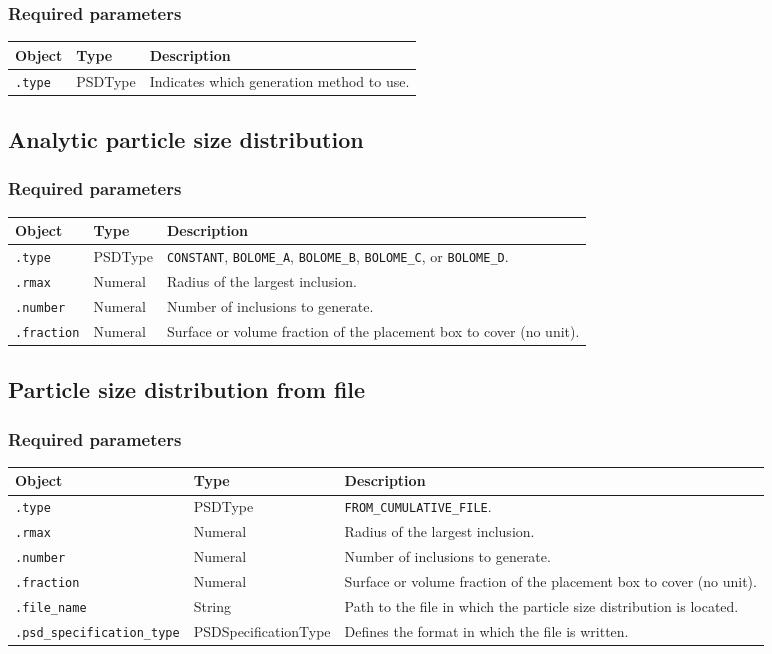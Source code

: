 \documentclass[10pt]{article}
\begin{document}
\subsubsection*{Required parameters}

\begin{tabularx}{\textwidth}{llX}
\hline 
Object & Type & Description \\ 
\hline 
\verb+.type+ & PSDType & Indicates which generation method to use. \\ 
\hline 
\end{tabularx}

\subsection{Analytic particle size distribution}

\subsubsection*{Required parameters}

\begin{tabularx}{\textwidth}{llX}
\hline 
Object & Type & Description \\ 
\hline 
\verb+.type+ & PSDType & \verb+CONSTANT+, \verb+BOLOME_A+, \verb+BOLOME_B+, \verb+BOLOME_C+, or \verb+BOLOME_D+. \\ 
\verb+.rmax+ & Numeral & Radius of the largest inclusion. \\ 
\verb+.number+ & Numeral & Number of inclusions to generate. \\ 
\verb+.fraction+ & Numeral & Surface or volume fraction of the placement box to cover (no unit). \\ 
\hline 
\end{tabularx}

\subsection{Particle size distribution from file}

\subsubsection*{Required parameters}

\begin{tabularx}{\textwidth}{llX}
\hline 
Object & Type & Description \\ 
\hline 
\verb+.type+ & PSDType & \verb+FROM_CUMULATIVE_FILE+. \\ 
\verb+.rmax+ & Numeral & Radius of the largest inclusion. \\ 
\verb+.number+ & Numeral & Number of inclusions to generate. \\ 
\verb+.fraction+ & Numeral & Surface or volume fraction of the placement box to cover (no unit). \\ 
\verb+.file_name+ & String & Path to the file in which the particle size distribution is located.\\ 
\verb+.psd_specification_type+ & PSDSpecificationType & Defines the format in which the file is written. \\ 
\hline 
\end{tabularx}
\end{document}
